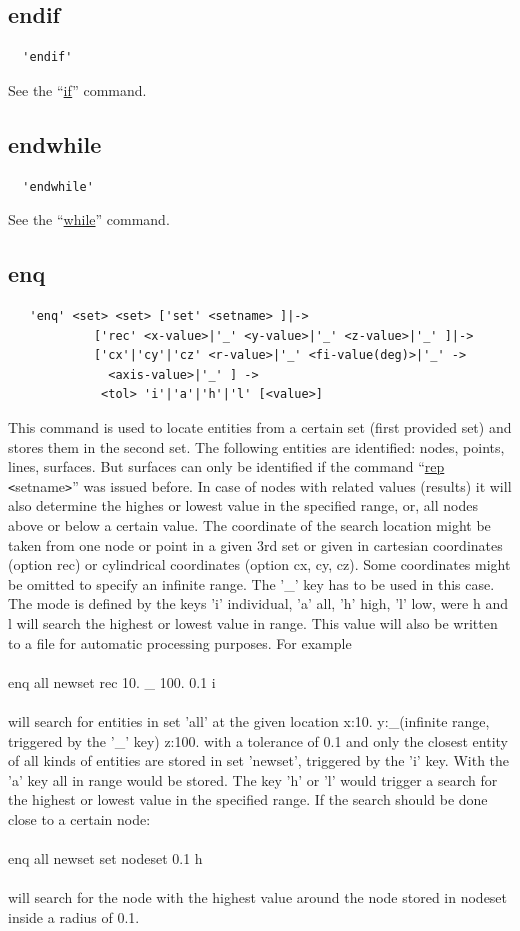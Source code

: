 \documentclass{article}
\providecommand{\htmlref}[2]{\hyperref[#2]{#1}}
\begin{document}
\subsection{\label{endif}endif}
\begin{verbatim}
  'endif'
\end{verbatim}
See the ``\htmlref{if}{if}'' command.

\subsection{\label{endwhile}endwhile}
\begin{verbatim}
  'endwhile'
\end{verbatim}
See the ``\htmlref{while}{while}'' command.

\subsection{\label{enq}enq}
\begin{verbatim}
   'enq' <set> <set> ['set' <setname> ]|->
            ['rec' <x-value>|'_' <y-value>|'_' <z-value>|'_' ]|->
            ['cx'|'cy'|'cz' <r-value>|'_' <fi-value(deg)>|'_' ->
              <axis-value>|'_' ] -> 
             <tol> 'i'|'a'|'h'|'l' [<value>]
\end{verbatim}
This command is used to locate entities from a certain set (first provided set) and stores them in the second set. The following entities are identified: nodes, points, lines, surfaces. But surfaces can only be identified if the command ``\htmlref{rep}{rep} \verb_<_setname\verb_>_'' was issued before. In case of nodes with related values (results) it will also determine the highes or lowest value in the specified range, or, all nodes above or below a certain value. The coordinate of the search location might be taken from one node or point in a given 3rd set or given in cartesian coordinates (option rec) or cylindrical coordinates (option cx, cy, cz). Some coordinates might be omitted to specify an infinite range. The '\_' key has to be used in this case. The mode is defined by the keys 'i' individual, 'a' all, 'h' high, 'l' low, were h and l will search the highest or lowest value in range. This value will also be written to a file for automatic processing purposes. For example\\\\
enq all newset rec 10. \_ 100. 0.1 i\\\\
will search for entities in set 'all' at the given location x:10. y:\_(infinite range, triggered by the '\_' key) z:100. with a tolerance of 0.1 and only the closest entity of all kinds of entities are stored in set 'newset', triggered by the 'i' key. With the 'a' key all in range would be stored. The key 'h' or 'l' would trigger a search for the highest or lowest value in the specified range. If the search should be done close to a certain node: \\\\
enq all newset set nodeset 0.1 h\\\\
will search for the node with the highest value around the node stored in nodeset inside a radius of 0.1.
\end{document}
